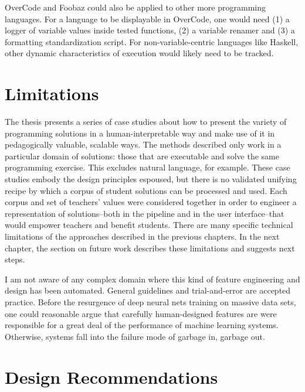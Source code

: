 OverCode and Foobaz could also be applied to other more programming languages. For a language to be displayable in OverCode, one would need (1) a logger of variable values inside tested functions, (2) a variable renamer and (3) a formatting standardization script. For non-variable-centric languages like Haskell, other dynamic characteristics of execution would likely need to be tracked.

\section{Limitations}

The thesis presents a series of case studies about how to present the variety of programming solutions in a human-interpretable way and make use of it in pedagogically valuable, scalable ways. The methods described only work in a particular domain of solutions: those that are executable and solve the same programming exercise. This excludes natural language, for example. These case studies embody the design principles espoused, but there is no validated unifying recipe by which a corpus of student solutions can be processed and used. Each corpus and set of teachers' values were considered together in order to engineer a representation of solutions--both in the pipeline and in the user interface--that would empower teachers and benefit students. There are many specific technical limitations of the approaches described in the previous chapters. In the next chapter, the section on future work describes these limitations and suggests next steps.

I am not aware of any complex domain where this kind of feature engineering and design has been automated. General guidelines and trial-and-error are accepted practice. Before the resurgence of deep neural nets training on massive data sets, one could reasonable argue that carefully human-designed features are were responsible for a great deal of the performance of machine learning systems. Otherwise, systems fall into the failure mode of garbage in, garbage out.

\section{Design Recommendations}

